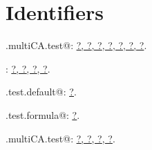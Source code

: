 \documentclass[reqno]{amsart}
\renewcommand{\NWlink}[2]{\hyperlink{#1}{#2}}
\begin{document}
\section{Identifiers}


{\small\begin{list}{}{\setlength{\itemsep}{-\parsep}\setlength{\itemindent}{-\leftmargin}}
\item \verb@.multiCA.test@: \underline{\NWlink{nuweb?}{?}}\NWlink{nuweb?}{, ?}\NWlink{nuweb?}{, ?}\NWlink{nuweb?}{, ?}\NWlink{nuweb?}{, ?}\NWlink{nuweb?}{, ?}\NWlink{nuweb?}{, ?}.
\item \verb@cnonct@: \underline{\NWlink{nuweb?}{?}}\NWlink{nuweb?}{, ?}\NWlink{nuweb?}{, ?}\NWlink{nuweb?}{, ?}.
\item \verb@multiCA.test.default@: \underline{\NWlink{nuweb?}{?}}.
\item \verb@multiCA.test.formula@: \underline{\NWlink{nuweb?}{?}}.
\item \verb@power.multiCA.test@: \underline{\NWlink{nuweb?}{?}}\NWlink{nuweb?}{, ?}\NWlink{nuweb?}{, ?}\NWlink{nuweb?}{, ?}.
\end{list}}
\end{document}
